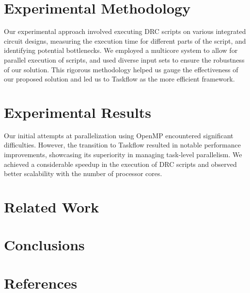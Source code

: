\documentclass[sigconf]{acmart}
\begin{document}
  \section{Experimental Methodology}
  Our experimental approach involved executing DRC scripts on various integrated circuit designs, measuring the execution time for different parts of the script, and identifying potential bottlenecks. We employed a multicore system to allow for parallel execution of scripts, and used diverse input sets to ensure the robustness of our solution. This rigorous methodology helped us gauge the effectiveness of our proposed solution and led us to Taskflow as the more efficient framework.
  
  \section{Experimental Results}
  Our initial attempts at parallelization using OpenMP encountered significant difficulties. However, the transition to Taskflow resulted in notable performance improvements, showcasing its superiority in managing task-level parallelism. We achieved a considerable speedup in the execution of DRC scripts and observed better scalability with the number of processor cores.
  
  \section{Related Work}

  
  \section{Conclusions}

  
  \section{References}
  
  
\end{document}

